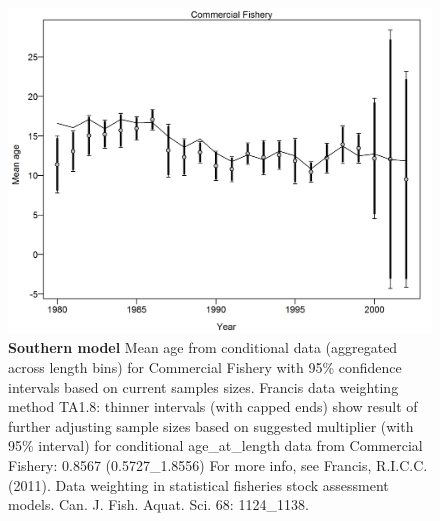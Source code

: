 \documentclass[12pt,]{article}
\begin{document}
\begin{figure}[htbp]
\centering
\includegraphics{./r4ss/plots_mod2/comp_condAALfit_data_weighting_TA1.8_condAgeCommercial Fishery.png}
\caption{\textbf{Southern model} Mean age from conditional data
(aggregated across length bins) for Commercial Fishery with 95\%
confidence intervals based on current samples sizes. Francis data
weighting method TA1.8: thinner intervals (with capped ends) show result
of further adjusting sample sizes based on suggested multiplier (with
95\% interval) for conditional age\_at\_length data from Commercial
Fishery: 0.8567 (0.5727\_1.8556) For more info, see Francis, R.I.C.C.
(2011). Data weighting in statistical fisheries stock assessment models.
Can. J. Fish. Aquat. Sci. 68: 1124\_1138.
\label{fig:mod2_4_comp_condAALfit_data_weighting_TA1.8_condAgeCommercial Fishery}}
\end{figure}
\end{document}
